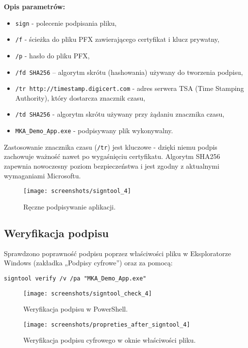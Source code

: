 \documentclass{article}
\begin{document}
\noindent\textbf{Opis parametrów:}
\begin{itemize}
    \item \texttt{sign} - polecenie podpisania pliku,
    \item \texttt{/f} - ścieżka do pliku PFX zawierającego certyfikat i klucz prywatny,
    \item \texttt{/p} - hasło do pliku PFX,
    \item \texttt{/fd SHA256} – algorytm skrótu (hashowania) używany do tworzenia podpisu,
    \item \texttt{/tr http://timestamp.digicert.com} - adres serwera TSA (Time Stamping Authority), który dostarcza znacznik czasu,
    \item \texttt{/td SHA256} - algorytm skrótu używany przy żądaniu znacznika czasu,
    \item \texttt{MKA\_Demo\_App.exe} - podpisywany plik wykonywalny.
\end{itemize}

\noindent Zastosowanie znacznika czasu (\texttt{/tr}) jest kluczowe - dzięki niemu podpis zachowuje ważność nawet po wygaśnięciu certyfikatu. Algorytm SHA256 zapewnia nowoczesny poziom bezpieczeństwa i jest zgodny z aktualnymi wymaganiami Microsoftu.


\begin{figure}[H]
    \centering
    \texttt{[image: screenshots/signtool\_4]}
    \caption{Ręczne podpisywanie aplikacji.}
    \label{fig:manual_signing}
\end{figure}

\subsection{Weryfikacja podpisu}
Sprawdzono poprawność podpisu poprzez właściwości pliku w Eksploratorze Windows (zakładka „Podpisy cyfrowe”) oraz za pomocą:

\begin{lstlisting}[style=command, caption=Weryfikacja podpisu]
signtool verify /v /pa "MKA_Demo_App.exe"
\end{lstlisting}


\begin{figure}[H]
    \centering
    \texttt{[image: screenshots/signtool\_check\_4]}
    \caption{Weryfikacja podpisu w PowerShell.}
    \label{fig:signature_check}
\end{figure}

\begin{figure}[H]
    \centering
    \texttt{[image: screenshots/propreties\_after\_signtool\_4]}
    \caption{Weryfikacja podpisu cyfrowego w oknie właściwości pliku.}
    \label{fig:digital_signature}
\end{figure}
\end{document}

